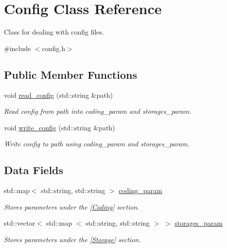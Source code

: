\hypertarget{classConfig}{\section{\-Config \-Class \-Reference}
\label{classConfig}
}


\-Class for dealing with config files.  




{\ttfamily \#include $<$config.\-h$>$}

\subsection*{\-Public \-Member \-Functions}
\begin{DoxyCompactItemize}
\item 
void \hyperlink{classConfig_a84db68fd51bf99e73437889d873253a6}{read\-\_\-config} (std\-::string \&path)
\begin{DoxyCompactList}\small\item\em \-Read config from path into coding\-\_\-param and storages\-\_\-param. \end{DoxyCompactList}\item 
void \hyperlink{classConfig_ae6eed13c1b8c0a456e3b97f1a912c51b}{write\-\_\-config} (std\-::string \&path)
\begin{DoxyCompactList}\small\item\em \-Write config to path using coding\-\_\-param and storages\-\_\-param. \end{DoxyCompactList}\end{DoxyCompactItemize}
\subsection*{\-Data \-Fields}
\begin{DoxyCompactItemize}
\item 
std\-::map$<$ std\-::string, \*
std\-::string $>$ \hyperlink{classConfig_a713930083fdf5de7c1e3c8ca4997024d}{coding\-\_\-param}
\begin{DoxyCompactList}\small\item\em \-Stores parameters under the \mbox{[}\hyperlink{classCoding}{\-Coding}\mbox{]} section. \end{DoxyCompactList}\item 
std\-::vector$<$ std\-::map\*
$<$ std\-::string, std\-::string $>$ $>$ \hyperlink{classConfig_a14078fe6fc46cb6c5bd1a3c3b9a4eb24}{storages\-\_\-param}
\begin{DoxyCompactList}\small\item\em \-Stores parameters under the \mbox{[}\hyperlink{classStorage}{\-Storage}\mbox{]} section. \end{DoxyCompactList}\end{DoxyCompactItemize}


